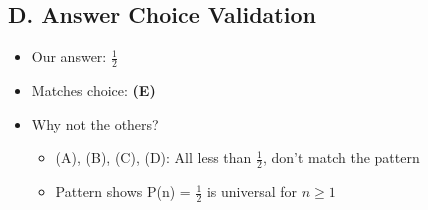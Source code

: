 \documentclass[11pt]{article}
\begin{document}
\begin{verificationbox}
\subsection*{D. Answer Choice Validation}
\begin{itemize}[leftmargin=*]
    \item Our answer: $\frac{1}{2}$
    \item Matches choice: \textbf{(E)}
    \item Why not the others?
    \begin{itemize}
        \item (A), (B), (C), (D): All less than $\frac{1}{2}$, don't match the pattern
        \item Pattern shows P(n) = $\frac{1}{2}$ is universal for $n \geq 1$
    \end{itemize}
\end{itemize}
\end{verificationbox}
\end{document}

